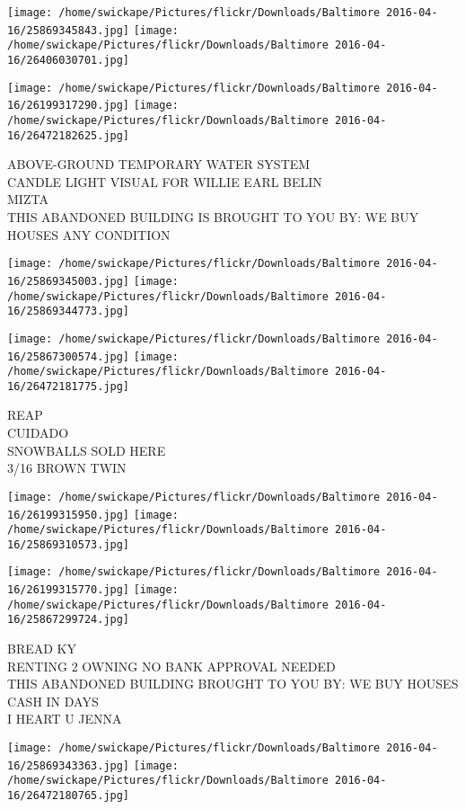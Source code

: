 \documentclass[10pt,letterpaper]{article}
\begin{document}
\texttt{[image: /home/swickape/Pictures/flickr/Downloads/Baltimore 2016-04-16/25869345843.jpg]}
\texttt{[image: /home/swickape/Pictures/flickr/Downloads/Baltimore 2016-04-16/26406030701.jpg]}

\texttt{[image: /home/swickape/Pictures/flickr/Downloads/Baltimore 2016-04-16/26199317290.jpg]}
\texttt{[image: /home/swickape/Pictures/flickr/Downloads/Baltimore 2016-04-16/26472182625.jpg]}

ABOVE{-}GROUND TEMPORARY WATER SYSTEM\\
CANDLE LIGHT VISUAL FOR WILLIE EARL BELIN\\
MIZTA\\
THIS ABANDONED BUILDING IS BROUGHT TO YOU BY: WE BUY HOUSES ANY CONDITION\\
\pagebreak

\texttt{[image: /home/swickape/Pictures/flickr/Downloads/Baltimore 2016-04-16/25869345003.jpg]}
\texttt{[image: /home/swickape/Pictures/flickr/Downloads/Baltimore 2016-04-16/25869344773.jpg]}

\texttt{[image: /home/swickape/Pictures/flickr/Downloads/Baltimore 2016-04-16/25867300574.jpg]}
\texttt{[image: /home/swickape/Pictures/flickr/Downloads/Baltimore 2016-04-16/26472181775.jpg]}

REAP\\
CUIDADO\\
SNOWBALLS SOLD HERE\\
3/16 BROWN TWIN\\
\pagebreak

\texttt{[image: /home/swickape/Pictures/flickr/Downloads/Baltimore 2016-04-16/26199315950.jpg]}
\texttt{[image: /home/swickape/Pictures/flickr/Downloads/Baltimore 2016-04-16/25869310573.jpg]}

\texttt{[image: /home/swickape/Pictures/flickr/Downloads/Baltimore 2016-04-16/26199315770.jpg]}
\texttt{[image: /home/swickape/Pictures/flickr/Downloads/Baltimore 2016-04-16/25867299724.jpg]}

BREAD KY\\
RENTING 2 OWNING NO BANK APPROVAL NEEDED\\
THIS ABANDONED BUILDING BROUGHT TO YOU BY: WE BUY HOUSES CASH IN DAYS\\
I HEART U JENNA\\
\pagebreak

\texttt{[image: /home/swickape/Pictures/flickr/Downloads/Baltimore 2016-04-16/25869343363.jpg]}
\texttt{[image: /home/swickape/Pictures/flickr/Downloads/Baltimore 2016-04-16/26472180765.jpg]}
\end{document}
